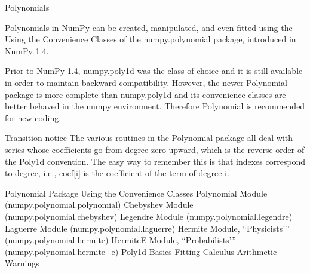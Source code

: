 Polynomials

Polynomials in NumPy can be created, manipulated, and even fitted using the Using the Convenience Classes of the numpy.polynomial package, introduced in NumPy 1.4.

Prior to NumPy 1.4, numpy.poly1d was the class of choice and it is still available in order to maintain backward compatibility. However, the newer Polynomial package is more complete than numpy.poly1d and its convenience classes are better behaved in the numpy environment. Therefore Polynomial is recommended for new coding.

Transition notice
The various routines in the Polynomial package all deal with series whose coefficients go from degree zero upward, which is the reverse order of the Poly1d convention. The easy way to remember this is that indexes correspond to degree, i.e., coef[i] is the coefficient of the term of degree i.

Polynomial Package
Using the Convenience Classes
Polynomial Module (numpy.polynomial.polynomial)
Chebyshev Module (numpy.polynomial.chebyshev)
Legendre Module (numpy.polynomial.legendre)
Laguerre Module (numpy.polynomial.laguerre)
Hermite Module, “Physicists’” (numpy.polynomial.hermite)
HermiteE Module, “Probabilists’” (numpy.polynomial.hermite_e)
Poly1d
Basics
Fitting
Calculus
Arithmetic
Warnings
